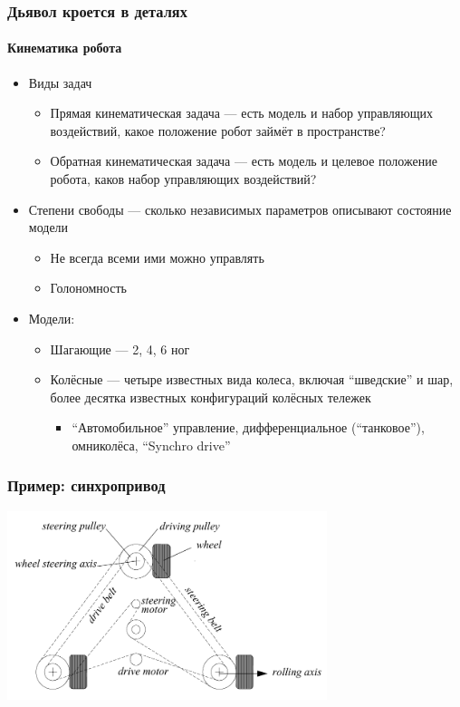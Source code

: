 \documentclass{../../slides-style}
\begin{document}
    \begin{frame}
        \frametitle{Дьявол кроется в деталях}
        \framesubtitle{Кинематика робота}
        \begin{itemize}
            \item Виды задач
            \begin{itemize}
                \item Прямая кинематическая задача --- есть модель и набор управляющих воздействий, какое положение робот займёт в пространстве?
                \item Обратная кинематическая задача --- есть модель и целевое положение робота, каков набор управляющих воздействий?
            \end{itemize}
            \item Степени свободы --- сколько независимых параметров описывают состояние модели
            \begin{itemize}
                \item Не всегда всеми ими можно управлять
                \item Голономность
            \end{itemize}
            \item Модели:
            \begin{itemize}
                \item Шагающие --- 2, 4, 6 ног
                \item Колёсные --- четыре известных вида колеса, включая \enquote{шведские} и шар, более десятка известных конфигураций колёсных тележек
                \begin{itemize}
                    \item \enquote{Автомобильное} управление, дифференциальное (\enquote{танковое}), омниколёса, \enquote{Synchro drive}
                \end{itemize}
            \end{itemize}
        \end{itemize}
    \end{frame}

    \begin{frame}
        \frametitle{Пример: синхропривод}
        \begin{center}
            \includegraphics[width=0.7\textwidth]{synchroDrive.png}
        \end{center}
    \end{frame}
\end{document}
